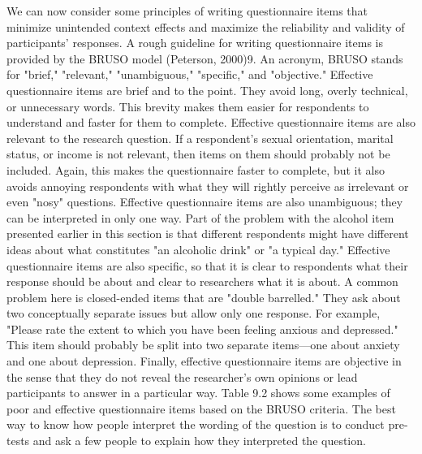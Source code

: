 We can now consider some principles of writing questionnaire items that minimize unintended context effects and maximize the reliability and validity of participants’ responses. A rough guideline for writing questionnaire items is provided by the BRUSO model (Peterson, 2000)9. An acronym, BRUSO stands for "brief," "relevant," "unambiguous," "specific," and "objective." Effective questionnaire items are brief and to the point. They avoid long, overly technical, or unnecessary words. This brevity makes them easier for respondents to understand and faster for them to complete. Effective questionnaire items are also relevant to the research question. If a respondent’s sexual orientation, marital status, or income is not relevant, then items on them should probably not be included. Again, this makes the questionnaire faster to complete, but it also avoids annoying respondents with what they will rightly perceive as irrelevant or even "nosy" questions. Effective questionnaire items are also unambiguous; they can be interpreted in only one way. Part of the problem with the alcohol item presented earlier in this section is that different respondents might have different ideas about what constitutes "an alcoholic drink" or "a typical day." Effective questionnaire items are also specific, so that it is clear to respondents what their response should be about and clear to researchers what it is about. A common problem here is closed-ended items that are "double barrelled." They ask about two conceptually separate issues but allow only one response. For example, "Please rate the extent to which you have been feeling anxious and depressed." This item should probably be split into two separate items---one about anxiety and one about depression. Finally, effective questionnaire items are objective in the sense that they do not reveal the researcher’s own opinions or lead participants to answer in a particular way. Table 9.2 shows some examples of poor and effective questionnaire items based on the BRUSO criteria. The best way to know how people interpret the wording of the question is to conduct pre-tests and ask a few people to explain how they interpreted the question.



